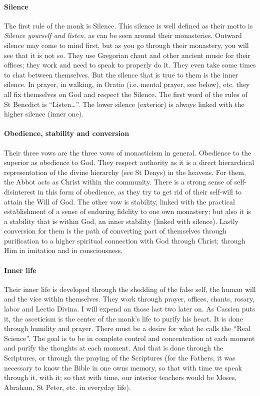 \paragraph{Silence}
The first rule of the monk is Silence. This silence is well defined as their motto is \textit{Silence yourself and listen, }as can be seen around their monasteries. Outward silence may come to mind first, but as you go through their monastery, you will see that it is not so. They use Gregorian chant and other ancient music for their offices; they work and need to speak to properly do it. They even take some times to chat between themselves. But the silence that is true to them is the inner silence. In prayer, in walking, in Oratio (i.e. mental prayer, see below), etc. they all fix themselves on God and respect the Silence. The first word of the rules of St Benedict is ``Listen…”. The lower silence (exterior) is always linked with the higher silence (inner one).

\paragraph{Obedience, stability and conversion}
Their three vows are the three vows of monasticism in general. Obedience to the superior as obedience to God. They respect authority as it is a direct hierarchical representation of the divine hierarchy (see St Denys) in the heavens. For them, the Abbot acts as Christ within the community. There is a strong sense of self-disinterest in this form of obedience, as they try to get rid of their self-will to attain the Will of God. The other vow is stability, linked with the practical establishment of a sense of enduring fidelity to one own monastery; but also it is a stability that is within God, an inner stability (linked with silence). Lastly conversion for them is the path of converting part of themselves through purification to a higher spiritual connection with God through Christ; through Him in imitation and in consciousness.

\paragraph{Inner life}
Their inner life is developed through the shedding of the false self, the human will and the vice within themselves. They work through prayer, offices, chants, rosary, labor and Lectio Divina. I will expend on those last two later on. As Cassien puts it, the asceticism is the center of the monk's life to purify his heart. It is done through humility and prayer. There must be a desire for what he calls the ``Real Science”. The goal is to be in complete control and concentration at each moment and purify the thoughts at each moment. And that is done through the Scriptures, or through the praying of the Scriptures (for the Fathers, it was necessary to know the Bible in one owns memory, so that with time we speak through it, with it; so that with time, our interior teachers would be Moses, Abraham, St Peter, etc. in everyday life).

